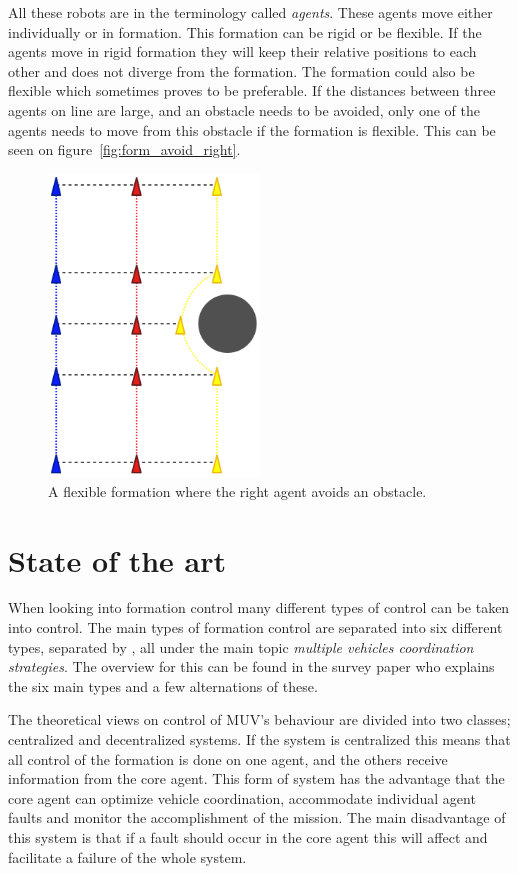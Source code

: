 All these robots are in the terminology called \textit{agents}. These agents move either individually or in formation. This formation can be rigid or be flexible. If the agents move in rigid formation they will keep their relative positions to each other and does not diverge from the formation. The formation could also be flexible which sometimes proves to be preferable. If the distances between three agents on line are large, and an obstacle needs to be avoided, only one of the agents needs to move from this obstacle if the formation is flexible. This can be seen on figure~\vref{fig:form_avoid_right}. 
\begin{figure}[htbp]
	\centering
	\includegraphics[width=0.5\textwidth]{fig/form_avoid_right}
	\caption{A flexible formation where the right agent avoids an obstacle.}
	\label{fig:form_avoid_right}
\end{figure}

\section{State of the art}
When looking into formation control many different types of control can be taken into control. The main types of formation control are separated into six different types, separated by \cite{muv-survey}, all under the main topic \textit{multiple vehicles coordination strategies}. The overview for this can be found in the survey paper \cite{muv-survey} who explains the six main types and a few alternations of these.

The theoretical views on control of \ac{MUV}'s behaviour are divided into two classes; centralized and decentralized systems. If the system is centralized this means that all control of the formation is done on one agent, and the others receive information from the core agent. This form of system has the advantage that the core agent can optimize vehicle coordination, accommodate individual agent faults and monitor the accomplishment of the mission. The main disadvantage of this system is that if a fault should occur in the core agent this will affect and facilitate a failure of the whole system.


